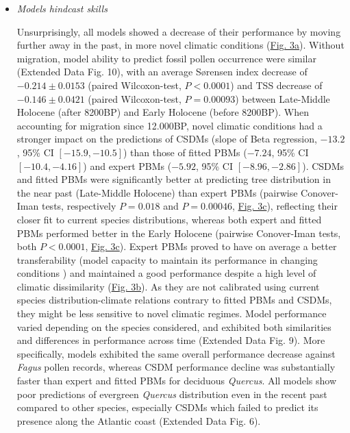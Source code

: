 \documentclass[pdflatex, sn-nature]{sn-jnl}%
\begin{document}
\renewcommand\labelitemi{{\boldmath$\cdot$}}
\begin{itemize}
\setlength\itemsep{1em}
\item \emph{Models hindcast skills}\par
Unsurprisingly, all models showed a decrease of their performance by moving further away in the past, in more novel climatic conditions (\hyperref[past_performance]{Fig. 3a}). Without migration, model ability to predict fossil pollen occurrence were similar (Extended Data Fig. 10), with an average Sørensen index decrease of $-0.214\pm0.0153$ (paired Wilcoxon-test, $P<0.0001$) and TSS decrease of $-0.146\pm0.0421$ (paired Wilcoxon-test, $P=0.00093$) between Late-Middle Holocene (after 8200BP) and Early Holocene (before 8200BP).  When accounting for migration since 12.000BP, novel climatic conditions had a stronger impact on the predictions of CSDMs (slope of Beta regression, $-13.2$, 95\% CI $[-15.9, -10.5]$) than those of fitted PBMs ($-7.24$, 95\% CI $[-10.4, -4.16]$) and expert PBMs ($-5.92$, 95\% CI $[-8.96, -2.86]$). CSDMs and fitted PBMs were significantly better at predicting tree distribution in the near past (Late-Middle Holocene) than expert PBMs (pairwise Conover-Iman tests, respectively $P=0.018$ and $P=0.00046$, \hyperref[past_performance]{Fig. 3c}), reflecting their closer fit to current species distributions, whereas both expert and fitted PBMs performed better in the Early Holocene (pairwise Conover-Iman tests, both $P<0.0001$, \hyperref[past_performance]{Fig. 3c}). Expert PBMs proved to have on average a better transferability (model capacity to maintain its performance in changing conditions \cite{UribeRivera2022}) and maintained a good performance despite a high level of climatic dissimilarity (\hyperref[past_performance]{Fig. 3b}). As they are not calibrated using current species distribution-climate relations contrary to fitted PBMs and CSDMs, they might be less sensitive to novel climatic regimes. Model performance varied depending on the species considered, and exhibited both similarities and differences in performance across time (Extended Data Fig. 9). More specifically, models exhibited the same overall performance decrease against \emph{Fagus} pollen records, whereas CSDM performance decline was substantially faster than expert and fitted PBMs for deciduous \emph{Quercus}. All models show poor predictions of evergreen \emph{Quercus} distribution even in the recent past compared to other species, especially CSDMs which failed to predict its presence along the Atlantic coast (Extended Data Fig. 6).


\end{itemize}
\end{document}
